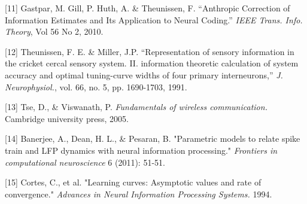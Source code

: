 \documentclass{article}
\begin{document}
[11] Gastpar, M.  Gill, P.  Huth, A. \& Theunissen, F. ``Anthropic
Correction of Information Estimates and Its Application to Neural
Coding.'' \emph{IEEE Trans. Info. Theory}, Vol 56 No 2, 2010.

[12] Theunissen, F. E. \& Miller, J.P. ``Representation of sensory
information in the cricket cercal sensory system. II. information
theoretic calculation of system accuracy and optimal tuning-curve
widths of four primary interneurons,'' \emph{J. Neurophysiol.}, vol. 66,
no. 5, pp. 1690-1703, 1991.

[13] Tse, D., \& Viswanath, P. \emph{Fundamentals of wireless
communication.} Cambridge university press, 2005.

[14] Banerjee, A., Dean, H. L.,  \& Pesaran, B. "Parametric
models to relate spike train and LFP dynamics with neural information
processing." \emph{Frontiers in computational neuroscience} 6 (2011): 51-51.

[15] Cortes, C., et al. "Learning curves: Asymptotic values and rate of convergence." \emph{Advances in Neural Information Processing Systems.} 1994.
\end{document}
